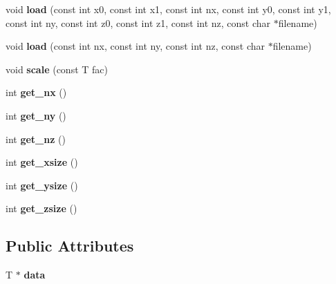 \begin{DoxyCompactItemize}
void {\bfseries load} (const int x0, const int x1, const int nx, const int y0, const int y1, const int ny, const int z0, const int z1, const int nz, const char $\ast$filename)
\item 
\hypertarget{classMatrix3d_a3d9308431626b0352d5b47603ef61fdc}{}\label{classMatrix3d_a3d9308431626b0352d5b47603ef61fdc} 
void {\bfseries load} (const int nx, const int ny, const int nz, const char $\ast$filename)
\item 
\hypertarget{classMatrix3d_a1c2c8c9fbf3dec15f4a8563ae2dbbbc1}{}\label{classMatrix3d_a1c2c8c9fbf3dec15f4a8563ae2dbbbc1} 
void {\bfseries scale} (const T fac)
\item 
\hypertarget{classMatrix3d_a16373c396a8e6cd5f4766a667308054f}{}\label{classMatrix3d_a16373c396a8e6cd5f4766a667308054f} 
int {\bfseries get\+\_\+nx} ()
\item 
\hypertarget{classMatrix3d_a9408dd026d7fbac4d08302536ad581a1}{}\label{classMatrix3d_a9408dd026d7fbac4d08302536ad581a1} 
int {\bfseries get\+\_\+ny} ()
\item 
\hypertarget{classMatrix3d_aee86893068958f4b1447a720d16f3a21}{}\label{classMatrix3d_aee86893068958f4b1447a720d16f3a21} 
int {\bfseries get\+\_\+nz} ()
\item 
\hypertarget{classMatrix3d_a51f7e43342aa6287fda1ddea32346527}{}\label{classMatrix3d_a51f7e43342aa6287fda1ddea32346527} 
int {\bfseries get\+\_\+xsize} ()
\item 
\hypertarget{classMatrix3d_a1b2d8c8be13cc6ea3f1c8e8822e10afe}{}\label{classMatrix3d_a1b2d8c8be13cc6ea3f1c8e8822e10afe} 
int {\bfseries get\+\_\+ysize} ()
\item 
\hypertarget{classMatrix3d_aaaeab4d3f5cc6af74f82ac7bd42f1886}{}\label{classMatrix3d_aaaeab4d3f5cc6af74f82ac7bd42f1886} 
int {\bfseries get\+\_\+zsize} ()
\end{DoxyCompactItemize}
\subsection*{Public Attributes}
\begin{DoxyCompactItemize}
\item 
\hypertarget{classMatrix3d_accb9a3fa73d931d63d63745ab95d6fbe}{}\label{classMatrix3d_accb9a3fa73d931d63d63745ab95d6fbe} 
T $\ast$ {\bfseries data}
\end{DoxyCompactItemize}
